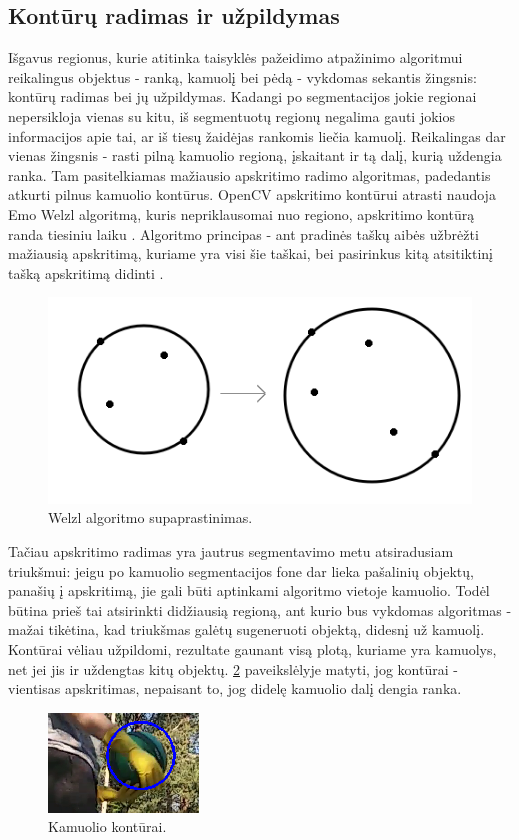 \documentclass{VUMIFPSkursinis}
\begin{document}
\subsection{Kontūrų radimas ir užpildymas}
Išgavus regionus, kurie atitinka taisyklės pažeidimo atpažinimo algoritmui reikalingus objektus - ranką, kamuolį bei pėdą - vykdomas sekantis žingsnis: kontūrų radimas bei jų užpildymas. Kadangi po segmentacijos jokie regionai nepersikloja vienas su kitu, iš segmentuotų regionų negalima gauti jokios informacijos apie tai, ar iš tiesų žaidėjas rankomis liečia kamuolį. Reikalingas dar vienas žingsnis - rasti pilną kamuolio regioną, įskaitant ir tą dalį, kurią uždengia ranka. Tam pasitelkiamas mažiausio apskritimo radimo algoritmas, padedantis atkurti pilnus kamuolio kontūrus. OpenCV apskritimo kontūrui atrasti naudoja Emo Welzl algoritmą, kuris nepriklausomai nuo regiono, apskritimo kontūrą randa tiesiniu laiku \cite{smallestenclosing}. Algoritmo principas - ant pradinės taškų aibės užbrėžti mažiausią apskritimą, kuriame yra visi šie taškai, bei pasirinkus kitą atsitiktinį tašką apskritimą didinti \cite{smallestenclosing}.
\begin{figure}[H]
	\centering
	\includegraphics[scale=1]{imgs/welzl}
	\caption{Welzl algoritmo supaprastinimas.}
	\label{imgs:welzl}
\end{figure}
Tačiau apskritimo radimas yra jautrus segmentavimo metu atsiradusiam triukšmui: jeigu po kamuolio segmentacijos fone dar lieka pašalinių objektų, panašių į apskritimą, jie gali būti aptinkami algoritmo vietoje kamuolio. Todėl būtina prieš tai atsirinkti didžiausią regioną, ant kurio bus vykdomas algoritmas - mažai tikėtina, kad triukšmas galėtų sugeneruoti objektą, didesnį už kamuolį.
Kontūrai vėliau užpildomi, rezultate gaunant visą plotą, kuriame yra kamuolys, net jei jis ir uždengtas kitų objektų. \ref{imgs:kamuol} paveikslėlyje matyti, jog kontūrai - vientisas apskritimas, nepaisant to, jog didelę kamuolio dalį dengia ranka.
\begin{figure}[H]
	\centering
	\includegraphics[scale=1]{imgs/kamuol}
	\caption{Kamuolio kontūrai.}
	\label{imgs:kamuol}
\end{figure}
\end{document}

